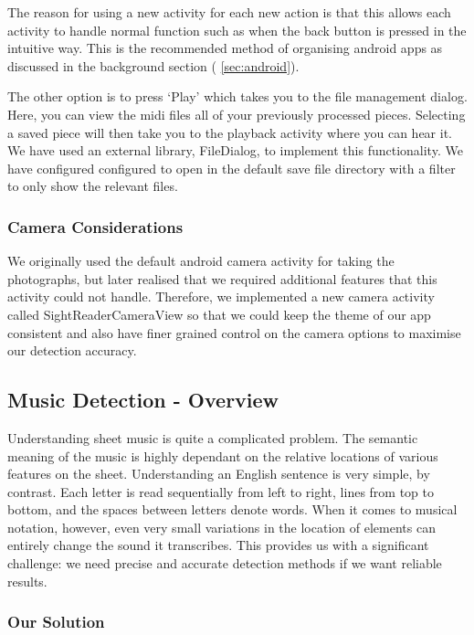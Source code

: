 The reason for using a new activity for each new action is that this allows each activity to handle normal function such as when the back button is pressed in the intuitive way. This is the recommended method of organising android apps as discussed in the background section ( \autoref{sec:android}).

The other option is to press ‘Play’ which takes you to the file management dialog. Here, you can view the midi files all of your previously processed pieces. Selecting a saved piece will then take you to the playback activity where you can hear it. We have used an external library, FileDialog\cite{FileDialog}, to implement this functionality. We have configured configured to open in the default save file directory with a filter to only show the relevant files.


\subsubsection{Camera Considerations}
We originally used the default android camera activity for taking the photographs, but later realised that we required additional features that this activity could not handle. Therefore, we implemented a new camera activity called SightReaderCameraView so that we could keep the theme of our app consistent and also have finer grained control on the camera options to maximise our detection accuracy.

\subsection{Music Detection - Overview}
Understanding sheet music is quite a complicated problem. The semantic meaning of the music is highly dependant on the relative locations of various features on the sheet. Understanding an English sentence is very simple, by contrast. Each letter is read sequentially from left to right, lines from top to bottom, and the spaces between letters denote words. When it comes to musical notation, however, even very small variations in the location of elements can entirely change the sound it
transcribes. This provides us with a significant challenge: we need precise and accurate detection methods if we want reliable results.

\subsubsection{Our Solution}

